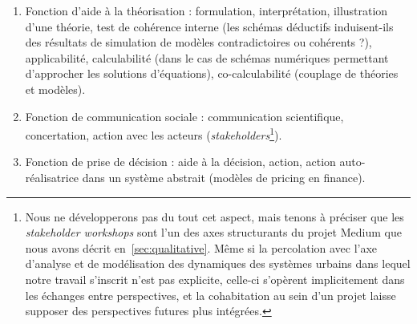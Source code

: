 {\begin{enumerate}
	\item Fonction d'aide à la théorisation : formulation, interprétation, illustration d'une théorie, test de cohérence interne (les schémas déductifs induisent-ils des résultats de simulation de modèles contradictoires ou cohérents ?), applicabilité, calculabilité (dans le cas de schémas numériques permettant d'approcher les solutions d'équations), co-calculabilité (couplage de théories et modèles).
	\item Fonction de communication sociale : communication scientifique, concertation, action avec les acteurs (\emph{stakeholders}\footnote{Nous ne développerons pas du tout cet aspect, mais tenons à préciser que les \emph{stakeholder workshops} sont l'un des axes structurants du projet Medium que nous avons décrit en~\ref{sec:qualitative}. Même si la percolation avec l'axe d'analyse et de modélisation des dynamiques des systèmes urbains dans lequel notre travail s'inscrit n'est pas explicite, celle-ci s'opèrent implicitement dans les échanges entre perspectives, et la cohabitation au sein d'un projet laisse supposer des perspectives futures plus intégrées.}).
	\item Fonction de prise de décision : aide à la décision, action, action auto-réalisatrice dans un système abstrait (modèles de pricing en finance).
\end{enumerate}
}


